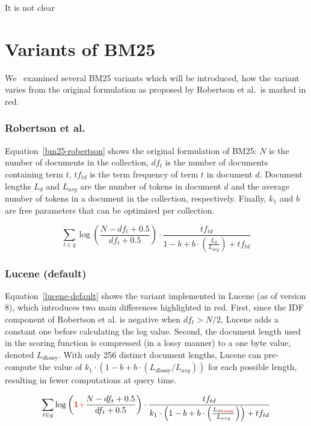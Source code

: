 It is not clear 

\section{Variants of BM25}
We~\cite{Kamphuis2020BM25} examined several BM25 variants which will be introduced, how the variant varies from the original formulation as proposed by Robertson et al.~is marked in red. 

\subsubsection{Robertson et al.~\cite{bm25-robertson}} 
Equation~\ref{bm25-robertson} shows the original formulation of BM25: $N$ is the number of documents in the collection, $df_t$ is the number of documents containing term $t$, $tf_{td}$ is the term frequency of term $t$ in document $d$. Document lengths $L_d$ and $L_{avg}$ are the number of tokens in document $d$ and the average number of tokens in a document in the collection, respectively. Finally, $k_1$ and $b$ are free parameters that can be optimized per collection. 

\begin{equation}
	\label{bm25-robertson}
	\sum_{t\in q} \log\left(\frac{N-df_t+0.5}{df_t+0.5}\right)\cdot\frac{tf_{td}}{1-b+b\cdot\left(\frac{L_d}{L_{avg}}\right) + tf_{td}}
\end{equation}

\subsubsection{Lucene (default)}
Equation~\ref{lucene-default} shows the variant implemented in Lucene (as of version 8), which introduces two main differences highlighted in red. First, since the IDF component of Robertson et al. is negative when $df_t > N/2$, Lucene adds a constant one before calculating the log value. Second, the document length used in the scoring function is compressed (in a lossy manner) to a one byte value, denoted $L_{d\text{lossy}}$. With only 256 distinct document lengths, Lucene can pre-compute the value of $k_1 \cdot (1-b+b\cdot(L_{d\text{lossy}}/L_{avg}))$ for each possible length, resulting in fewer computations at query time.

\begin{equation}
	\label{lucene-default}
	\sum_{t\in q}\log\left(\mathbf{\begingroup\color{ruhuisstijlrood}1 +\endgroup} \frac{N-df_t+0.5}{df_t+0.5}\right)\cdot\frac{tf_{td}}{k_1\cdot\left(1-b+b\cdot\left(\frac{L_{d \mathbf{\begingroup\color{ruhuisstijlrood}lossy\endgroup}}}{L_{avg}}\right)\right)+tf_{td}}
\end{equation}

